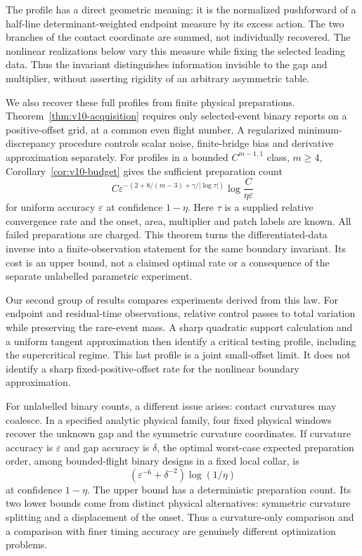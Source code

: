The profile has a direct geometric meaning: it is the normalized
pushforward of a half-line determinant-weighted endpoint measure by
its excess action. The two branches of the contact coordinate are
summed, not individually recovered. The nonlinear realizations below
vary this measure while fixing the selected leading data. Thus the
invariant distinguishes information invisible to the gap and multiplier,
without asserting rigidity of an arbitrary asymmetric table.

We also recover these full profiles from finite physical preparations.
Theorem~\ref{thm:v10-acquisition} requires only selected-event binary
reports on a positive-offset grid, at a common even flight number.
A regularized minimum-discrepancy procedure controls scalar noise,
finite-bridge bias and derivative approximation separately. For profiles
in a bounded $C^{m-1,1}$ class, $m\ge4$, Corollary~\ref{cor:v10-budget}
gives the sufficient preparation count
\[
 C\varepsilon^{-\left(2+8/(m-3)+\gamma/|\log\tau|\right)}
                         \log\frac{C}{\eta\varepsilon}
\]
for uniform accuracy $\varepsilon$ at confidence $1-\eta$.
Here $\tau$ is a supplied relative convergence rate and the onset,
area, multiplier and patch labels are known. All failed preparations
are charged. This theorem turns the differentiated-data inverse into
a finite-observation statement for the same boundary invariant. Its
cost is an upper bound, not a claimed optimal rate or a consequence
of the separate unlabelled parametric experiment.

Our second group of results compares experiments derived from this law.
For endpoint and residual-time observations, relative control passes to
total variation while preserving the rare-event mass. A sharp quadratic
support calculation and a uniform tangent approximation then identify a
critical testing profile, including the supercritical regime. This last
profile is a joint small-offset limit. It does not identify a sharp
fixed-positive-offset rate for the nonlinear boundary approximation.

For unlabelled binary counts, a different issue arises: contact
curvatures may coalesce. In a specified analytic physical family, four
fixed physical windows recover the unknown gap and the symmetric
curvature coordinates. If curvature accuracy is $\varepsilon$ and gap
accuracy is $\delta$, the optimal worst-case expected preparation order,
among bounded-flight binary designs in a fixed local collar, is
\[
                (\varepsilon^{-6}+\delta^{-2})\log(1/\eta)
\]
at confidence $1-\eta$. The upper bound has a deterministic preparation
count. Its two lower bounds come from distinct physical alternatives:
symmetric curvature splitting and a displacement of the onset. Thus a
curvature-only comparison and a comparison with finer timing accuracy
are genuinely different optimization problems.

